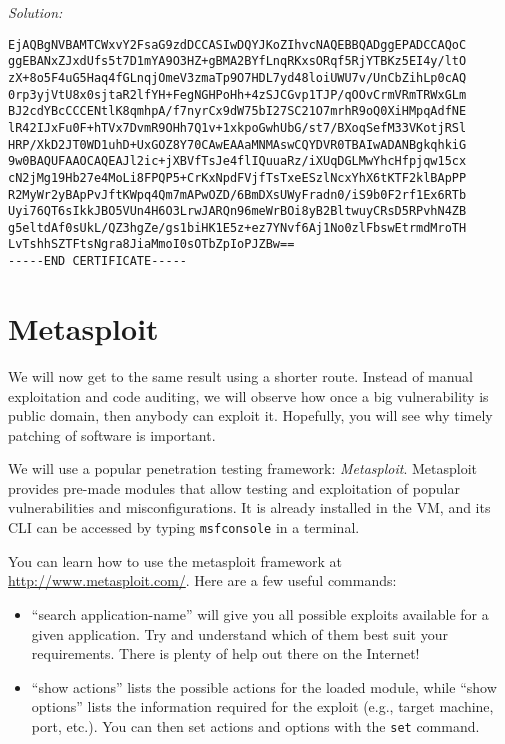 \documentclass[a4paper,11pt]{article}
\newenvironment{solution}%
{\par{\noindent\small\textit{Solution:}}\vspace{-12pt}\begin{framed}}%
{\end{framed}\par}
\begin{document}
\begin{enumerate}
\begin{solution}
\begin{verbatim}
EjAQBgNVBAMTCWxvY2FsaG9zdDCCASIwDQYJKoZIhvcNAQEBBQADggEPADCCAQoC
ggEBANxZJxdUfs5t7D1mYA9O3HZ+gBMA2BYfLnqRKxsORqf5RjYTBKz5EI4y/ltO
zX+8o5F4uG5Haq4fGLnqjOmeV3zmaTp9O7HDL7yd48loiUWU7v/UnCbZihLp0cAQ
0rp3yjVtU8x0sjtaR2lfYH+FegNGHPoHh+4zSJCGvp1TJP/qOOvCrmVRmTRWxGLm
BJ2cdYBcCCCENtlK8qmhpA/f7nyrCx9dW75bI27SC21O7mrhR9oQ0XiHMpqAdfNE
lR42IJxFu0F+hTVx7DvmR9OHh7Q1v+1xkpoGwhUbG/st7/BXoqSefM33VKotjRSl
HRP/XkD2JT0WD1uhD+UxGOZ8Y70CAwEAAaMNMAswCQYDVR0TBAIwADANBgkqhkiG
9w0BAQUFAAOCAQEAJl2ic+jXBVfTsJe4flIQuuaRz/iXUqDGLMwYhcHfpjqw15cx
cN2jMg19Hb27e4MoLi8FPQP5+CrKxNpdFVjfTsTxeESzlNcxYhX6tKTF2klBApPP
R2MyWr2yBApPvJftKWpq4Qm7mAPwOZD/6BmDXsUWyFradn0/iS9b0F2rf1Ex6RTb
Uyi76QT6sIkkJBO5VUn4H6O3LrwJARQn96meWrBOi8yB2BltwuyCRsD5RPvhN4ZB
g5eltdAf0sUkL/QZ3hgZe/gs1biHK1E5z+ez7YNvf6Aj1No0zlFbswEtrmdMroTH
LvTshhSZTFtsNgra8JiaMmoI0sOTbZpIoPJZBw==
-----END CERTIFICATE----- 
\end{verbatim}

\end{solution}\fi
	

\end{enumerate}

\section{Metasploit}
We will now get to the same result using a shorter route.
Instead of manual exploitation and code auditing, we will observe how once a big vulnerability is public domain, then anybody can exploit it. Hopefully, you will see why timely patching of software is important.

We will use a popular penetration testing framework: \textit{Metasploit}. 
Metasploit provides pre-made modules that allow testing and exploitation of popular vulnerabilities and misconfigurations.
It is already installed in the VM, and its CLI can be accessed by typing \texttt{msfconsole} in a terminal.

You can learn how to use the metasploit framework at
\url{http://www.metasploit.com/}. Here are a few useful commands:
\begin{itemize}
	\item ``search application-name'' will give you all possible exploits
	available for a given application. Try and understand which of them
	best suit your requirements. There is plenty of help out there on
	the Internet!
	\item ``show actions'' lists the possible actions for the loaded module, while ``show options'' lists the information required for the exploit (e.g., target machine, port, etc.). You can then set actions and options with the \texttt{set} command.
\end{itemize}
\end{document}
